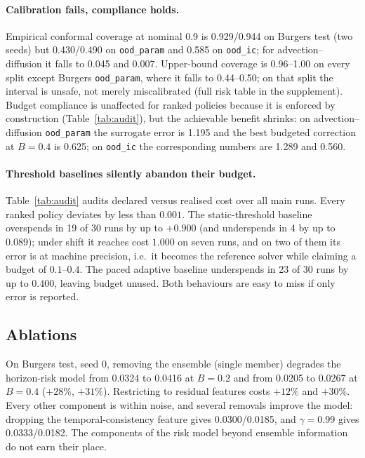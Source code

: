 \documentclass[11pt]{article}
\begin{document}
\paragraph{Calibration fails, compliance holds.} Empirical conformal coverage at
nominal 0.9 is 0.929/0.944 on Burgers test (two seeds) but 0.430/0.490 on
\texttt{ood\_param} and 0.585 on \texttt{ood\_ic}; for advection--diffusion it
falls to 0.045 and 0.007. Upper-bound coverage is 0.96--1.00 on every split
except Burgers \texttt{ood\_param}, where it falls to 0.44--0.50; on that split
the interval is unsafe, not merely miscalibrated (full risk table in the
supplement). Budget compliance
is unaffected for ranked policies because it is enforced by construction
(Table~\ref{tab:audit}), but the achievable benefit shrinks: on
advection--diffusion \texttt{ood\_param} the surrogate error is 1.195 and the
best budgeted correction at $B=0.4$ is 0.625; on \texttt{ood\_ic} the
corresponding numbers are 1.289 and 0.560.

\paragraph{Threshold baselines silently abandon their budget.}
Table~\ref{tab:audit} audits declared versus realised cost over all main runs.
Every ranked policy deviates by less than $0.001$. The static-threshold baseline
overspends in 19 of 30 runs by up to $+0.900$ (and underspends in 4 by up to
$0.089$); under shift it reaches cost $1.000$ on seven runs, and on two of them
its error is at machine precision, i.e.\ it becomes the reference solver while
claiming a budget of $0.1$--$0.4$. The paced adaptive baseline underspends in
23 of 30 runs by up to $0.400$, leaving budget unused. Both behaviours are easy
to miss if only error is reported.

\begin{table}[t]
\centering
\small

\caption{Declared versus realised cost across all main runs. `over'/'under'
count runs deviating by more than $0.02$.}
\label{tab:audit}
\end{table}

\subsection{Ablations}
\label{sec:ablation}

On Burgers test, seed 0, removing the ensemble (single member) degrades the
horizon-risk model from 0.0324 to 0.0416 at $B=0.2$ and from 0.0205 to 0.0267 at
$B=0.4$ ($+28\%$, $+31\%$). Restricting to residual features costs $+12\%$ and
$+30\%$. Every other component is within noise, and several removals improve the
model: dropping the temporal-consistency feature gives 0.0300/0.0185, and
$\gamma=0.99$ gives 0.0333/0.0182. The components of the risk model beyond
ensemble information do not earn their place.
\end{document}
